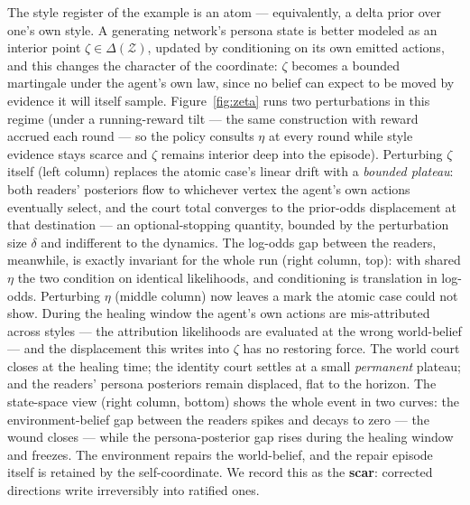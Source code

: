 \documentclass[11pt]{article}
\begin{document}
The style register of the example is an atom --- equivalently, a delta prior over one's own style. A generating network's persona state is better modeled as an interior point $\zeta \in \Delta(\mathcal Z)$, updated by conditioning on its own emitted actions, and this changes the character of the coordinate: $\zeta$ becomes a bounded martingale under the agent's own law, since no belief can expect to be moved by evidence it will itself sample. Figure~\ref{fig:zeta} runs two perturbations in this regime (under a running-reward tilt --- the same construction with reward accrued each round --- so the policy consults $\eta$ at every round while style evidence stays scarce and $\zeta$ remains interior deep into the episode). Perturbing $\zeta$ itself (left column) replaces the atomic case's linear drift with a \emph{bounded plateau}: both readers' posteriors flow to whichever vertex the agent's own actions eventually select, and the court total converges to the prior-odds displacement at that destination --- an optional-stopping quantity, bounded by the perturbation size $\delta$ and indifferent to the dynamics. The log-odds gap between the readers, meanwhile, is exactly invariant for the whole run (right column, top): with shared $\eta$ the two condition on identical likelihoods, and conditioning is translation in log-odds. Perturbing $\eta$ (middle column) now leaves a mark the atomic case could not show. During the healing window the agent's own actions are mis-attributed across styles --- the attribution likelihoods are evaluated at the wrong world-belief --- and the displacement this writes into $\zeta$ has no restoring force. The world court closes at the healing time; the identity court settles at a small \emph{permanent} plateau; and the readers' persona posteriors remain displaced, flat to the horizon. The state-space view (right column, bottom) shows the whole event in two curves: the environment-belief gap between the readers spikes and decays to zero --- the wound closes --- while the persona-posterior gap rises during the healing window and freezes. The environment repairs the world-belief, and the repair episode itself is retained by the self-coordinate. We record this as the \textbf{scar}: corrected directions write irreversibly into ratified ones.
\end{document}
